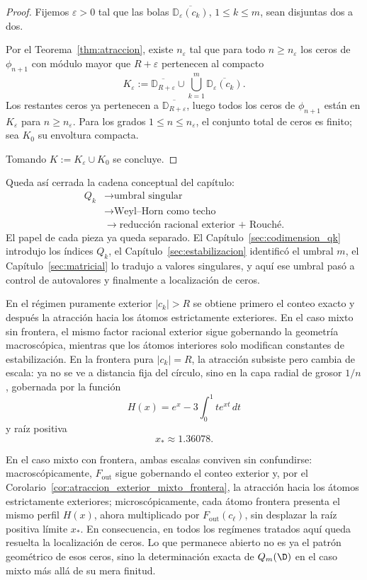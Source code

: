 \begin{proof}
	Fijemos $\varepsilon>0$ tal que las bolas $\overline{\mathbb{D}_{\varepsilon}(c_k)}$, $1\le k\le m$, sean disjuntas dos a dos.

	Por el Teorema~\ref{thm:atraccion}, existe $n_\varepsilon$ tal que para todo $n\ge n_\varepsilon$ los ceros de $\phi_{n+1}$ con módulo mayor que $R+\varepsilon$ pertenecen al compacto
	\[
		K_\varepsilon:=\overline{\mathbb{D}_{R+\varepsilon}}\cup
		\bigcup_{k=1}^m\overline{\mathbb{D}_{\varepsilon}(c_k)}.
	\]
	Los restantes ceros ya pertenecen a $\overline{\mathbb D_{R+\varepsilon}}$, luego todos los ceros de $\phi_{n+1}$ están en $K_\varepsilon$ para $n\ge n_\varepsilon$.
	Para los grados $1\le n\le n_\varepsilon$, el conjunto total de ceros es finito; sea $K_0$ su envoltura compacta.

	Tomando $K:=K_\varepsilon\cup K_0$ se concluye.
\end{proof}

Queda así cerrada la cadena conceptual del capítulo:
\[
	\begin{aligned}
		Q_k & \longrightarrow \text{umbral singular}                       \\
		    & \longrightarrow \text{Weyl--Horn como techo}                 \\
		    & \longrightarrow \text{reducción racional exterior + Rouché}.
	\end{aligned}
\]
El papel de cada pieza ya queda separado. El Capítulo~\ref{sec:codimension_qk} introdujo los índices $Q_k$, el Capítulo~\ref{sec:estabilizacion} identificó el umbral $m$, el Capítulo~\ref{sec:matricial} lo tradujo a valores singulares, y aquí ese umbral pasó a control de autovalores y finalmente a localización de ceros.

En el régimen puramente exterior $|c_k|>R$ se obtiene primero el conteo exacto y después la atracción hacia los átomos estrictamente exteriores. En el caso mixto sin frontera, el mismo factor racional exterior sigue gobernando la geometría macroscópica, mientras que los átomos interiores solo modifican constantes de estabilización. En la frontera pura $|c_k|=R$, la atracción subsiste pero cambia de escala: ya no se ve a distancia fija del círculo, sino en la capa radial de grosor $1/n$, gobernada por la función
\[
	H(x)=e^x-3\int_0^1 t e^{xt}\,dt
\]
y raíz positiva
\[
	x_*\approx 1.36078.
\]

En el caso mixto con frontera, ambas escalas conviven sin confundirse: macroscópicamente, $F_{\mathrm{out}}$ sigue gobernando el conteo exterior y, por el Corolario~\ref{cor:atraccion_exterior_mixto_frontera}, la atracción hacia los átomos estrictamente exteriores; microscópicamente, cada átomo frontera presenta el mismo perfil $H(x)$, ahora multiplicado por $F_{\mathrm{out}}(c_\ell)$, sin desplazar la raíz positiva límite $x_*$. En consecuencia, en todos los regímenes tratados aquí queda resuelta la localización de ceros. Lo que permanece abierto no es ya el patrón geométrico de esos ceros, sino la determinación exacta de $Q_m(\D)$ en el caso mixto más allá de su mera finitud.
